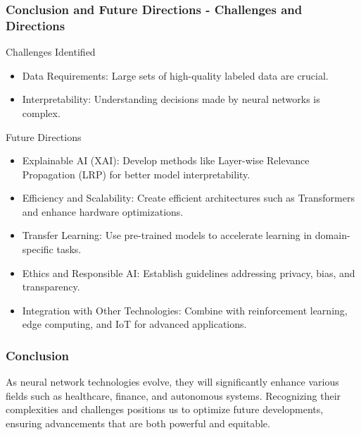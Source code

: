 \documentclass[aspectratio=169]{beamer}
\begin{document}
\begin{frame}[fragile]
  \frametitle{Conclusion and Future Directions - Challenges and Directions}
  
  \begin{block}{Challenges Identified}
    \begin{itemize}
      \item Data Requirements: Large sets of high-quality labeled data are crucial.
      \item Interpretability: Understanding decisions made by neural networks is complex.
    \end{itemize}
  \end{block}
  
  \begin{block}{Future Directions}
    \begin{itemize}
      \item Explainable AI (XAI): Develop methods like Layer-wise Relevance Propagation (LRP) for better model interpretability.
      \item Efficiency and Scalability: Create efficient architectures such as Transformers and enhance hardware optimizations.
      \item Transfer Learning: Use pre-trained models to accelerate learning in domain-specific tasks.
      \item Ethics and Responsible AI: Establish guidelines addressing privacy, bias, and transparency.
      \item Integration with Other Technologies: Combine with reinforcement learning, edge computing, and IoT for advanced applications.
    \end{itemize}
  \end{block}

\end{frame}

\begin{frame}[fragile]
  \frametitle{Conclusion}

  As neural network technologies evolve, they will significantly enhance various fields such as healthcare, finance, and autonomous systems. Recognizing their complexities and challenges positions us to optimize future developments, ensuring advancements that are both powerful and equitable.

\end{frame}
\end{document}
